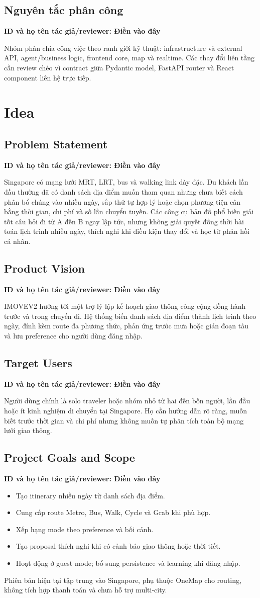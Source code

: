 \documentclass[12pt,a4paper,oneside]{report}
\newcommand{\tacgia}{%
  \begin{tcolorbox}[colback=blue!3,colframe=blue!25,boxrule=0.4pt,arc=1mm]
    \small\textbf{ID và họ tên tác giả/reviewer: Điền vào đây}
  \end{tcolorbox}
}
\begin{document}
\section{Nguyên tắc phân công}
\tacgia
Nhóm phân chia công việc theo ranh giới kỹ thuật: infrastructure và external API, agent/business logic, frontend core, map và realtime. Các thay đổi liên tầng cần review chéo vì contract giữa Pydantic model, FastAPI router và React component liên hệ trực tiếp.

\chapter{Idea}
\section{Problem Statement}
\tacgia
Singapore có mạng lưới MRT, LRT, bus và walking link dày đặc. Du khách lần đầu thường đã có danh sách địa điểm muốn tham quan nhưng chưa biết cách phân bổ chúng vào nhiều ngày, sắp thứ tự hợp lý hoặc chọn phương tiện cân bằng thời gian, chi phí và số lần chuyển tuyến. Các công cụ bản đồ phổ biến giải tốt câu hỏi đi từ A đến B ngay lập tức, nhưng không giải quyết đồng thời bài toán lịch trình nhiều ngày, thích nghi khi điều kiện thay đổi và học từ phản hồi cá nhân.

\section{Product Vision}
\tacgia
IMOVEV2 hướng tới một trợ lý lập kế hoạch giao thông công cộng đồng hành trước và trong chuyến đi. Hệ thống biến danh sách địa điểm thành lịch trình theo ngày, đính kèm route đa phương thức, phản ứng trước mưa hoặc gián đoạn tàu và lưu preference cho người dùng đăng nhập.

\section{Target Users}
\tacgia
Người dùng chính là solo traveler hoặc nhóm nhỏ từ hai đến bốn người, lần đầu hoặc ít kinh nghiệm di chuyển tại Singapore. Họ cần hướng dẫn rõ ràng, muốn biết trước thời gian và chi phí nhưng không muốn tự phân tích toàn bộ mạng lưới giao thông.

\section{Project Goals and Scope}
\tacgia
\begin{itemize}
  \item Tạo itinerary nhiều ngày từ danh sách địa điểm.
  \item Cung cấp route Metro, Bus, Walk, Cycle và Grab khi phù hợp.
  \item Xếp hạng mode theo preference và bối cảnh.
  \item Tạo proposal thích nghi khi có cảnh báo giao thông hoặc thời tiết.
  \item Hoạt động ở guest mode; bổ sung persistence và learning khi đăng nhập.
\end{itemize}
Phiên bản hiện tại tập trung vào Singapore, phụ thuộc OneMap cho routing, không tích hợp thanh toán và chưa hỗ trợ multi-city.
\end{document}
